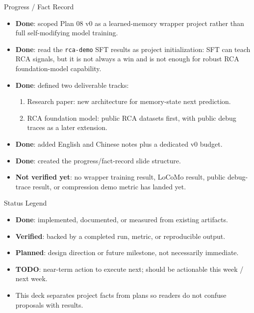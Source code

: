\begin{frame}{Progress / Fact Record}
  \begin{itemize}
    \item \textbf{Done}: scoped Plan 08 v0 as a learned-memory wrapper project rather than full self-modifying model training.
    \item \textbf{Done}: read the \texttt{rca-demo} SFT results as project initialization: SFT can teach RCA signals, but it is not always a win and is not enough for robust RCA foundation-model capability.
    \item \textbf{Done}: defined two deliverable tracks:
      \begin{enumerate}
        \item Research paper: new architecture for memory-state next prediction.
        \item RCA foundation model: public RCA datasets first, with public debug traces as a later extension.
      \end{enumerate}
    \item \textbf{Done}: added English and Chinese notes plus a dedicated v0 budget.
    \item \textbf{Done}: created the progress/fact-record slide structure.
    \item \textbf{Not verified yet}: no wrapper training result, LoCoMo result, public debug-trace result, or compression demo metric has landed yet.
  \end{itemize}
\end{frame}

\begin{frame}{Status Legend}
  \begin{itemize}
    \item \textbf{Done}: implemented, documented, or measured from existing artifacts.
    \item \textbf{Verified}: backed by a completed run, metric, or reproducible output.
    \item \textbf{Planned}: design direction or future milestone, not necessarily immediate.
    \item \textbf{TODO}: near-term action to execute next; should be actionable this week / next week.
    \item This deck separates project facts from plans so readers do not confuse proposals with results.
  \end{itemize}
\end{frame}

